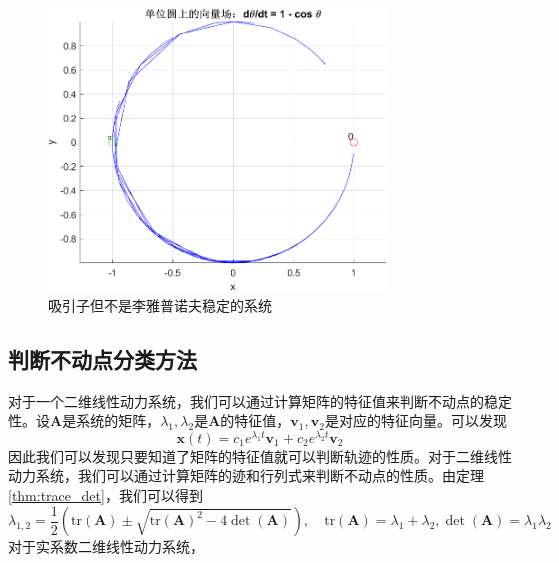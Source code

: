 \begin{figure}[H]
    \centering
    \includegraphics[width=0.8\textwidth]{Img/fix1.png}
    \caption{吸引子但不是李雅普诺夫稳定的系统}
    \label{fig:attractor}
\end{figure}
\subsection{判断不动点分类方法}

对于一个二维线性动力系统，我们可以通过计算矩阵的特征值来判断不动点的稳定性。设$\mathbf{A}$是系统的矩阵，$\lambda_1,\lambda_2$是$\mathbf{A}$的特征值，$\mathbf{v}_1,\mathbf{v}_2$是对应的特征向量。可以发现
\begin{equation}
    \mathbf{x}(t)=c_1e^{\lambda_1t}\mathbf{v}_1+c_2e^{\lambda_2t}\mathbf{v}_2
\end{equation}
因此我们可以发现只要知道了矩阵的特征值就可以判断轨迹的性质。对于二维线性动力系统，我们可以通过计算矩阵的迹和行列式来判断不动点的性质。由定理\ref{thm:trace_det}，我们可以得到
\begin{equation}
    \lambda_{1,2}=\frac{1}{2}\left(\text{tr}(\mathbf{A})\pm \sqrt{\text{tr}(\mathbf{A})^2-4\det(\mathbf{A})}\right),\quad \text{tr}(\mathbf{A})=\lambda_1+\lambda_2,\det(\mathbf{A})=\lambda_1\lambda_2
\end{equation}
对于实系数二维线性动力系统，

